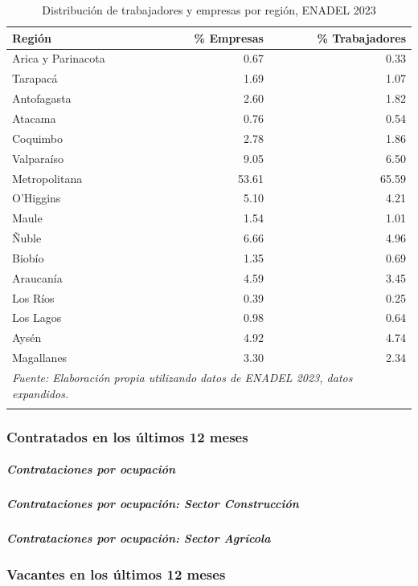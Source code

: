 \documentclass[
]{article}
\begin{document}
\begin{longtable}[t]{lrr}
\caption{\label{tab:unnamed-chunk-2}Distribución de trabajadores y empresas por región, ENADEL 2023}\\
\toprule
Región & \% Empresas & \% Trabajadores\\
\midrule
Arica y Parinacota & 0.67 & 0.33\\
Tarapacá & 1.69 & 1.07\\
Antofagasta & 2.60 & 1.82\\
Atacama & 0.76 & 0.54\\
Coquimbo & 2.78 & 1.86\\
\addlinespace
Valparaíso & 9.05 & 6.50\\
Metropolitana & 53.61 & 65.59\\
O'Higgins & 5.10 & 4.21\\
Maule & 1.54 & 1.01\\
Ñuble & 6.66 & 4.96\\
\addlinespace
Biobío & 1.35 & 0.69\\
Araucanía & 4.59 & 3.45\\
Los Ríos & 0.39 & 0.25\\
Los Lagos & 0.98 & 0.64\\
Aysén & 4.92 & 4.74\\
\addlinespace
Magallanes & 3.30 & 2.34\\
\bottomrule
\multicolumn{3}{l}{\rule{0pt}{1em}\textit{Fuente: Elaboración propia utilizando datos de ENADEL 2023, datos expandidos.}}\\
\multicolumn{3}{l}{\rule{0pt}{1em}}\\
\end{longtable}

\subsubsection{Contratados en los últimos 12
meses}\label{contratados-en-los-uxfaltimos-12-meses}

\subparagraph{Contrataciones por
ocupación}\label{contrataciones-por-ocupaciuxf3n}

\subparagraph{Contrataciones por ocupación: Sector
Construcción}\label{contrataciones-por-ocupaciuxf3n-sector-construcciuxf3n}

\subparagraph{Contrataciones por ocupación: Sector
Agrícola}\label{contrataciones-por-ocupaciuxf3n-sector-agruxedcola}

\subsubsection{Vacantes en los últimos 12
meses}\label{vacantes-en-los-uxfaltimos-12-meses}
\end{document}
